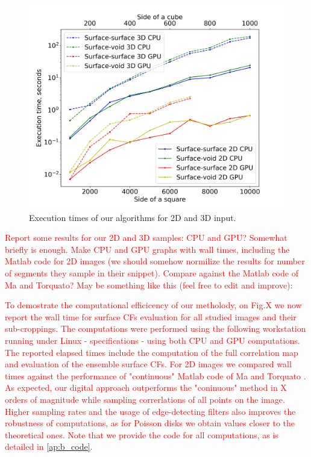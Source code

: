\documentclass[reprint,amsmath,amssymb,aps,pre,showkeys,showpacs]{revtex4-1}
\begin{document}
\begin{figure}[ht]
  \centering
  \includegraphics[width=\linewidth]{images/exec-time.png}
  \caption[]{Execution times of our algorithms for 2D and 3D input.}
  \label{fig:exec-times}
\end{figure}

\textcolor{red}{Report some results for our 2D and 3D samples: CPU and GPU?
  Somewhat briefly is enough. Make CPU and GPU graphs with wall times, including
  the Matlab code for 2D images (we should somehow normilize the results for
  number of segments they sample in their snippet). Compare against the Matlab
  code of Ma and Torquato? May be something like this (feel free to edit and
  improve):}

\textcolor{red}{To demostrate the computational efficicency of our metholody, on
  Fig.X we now report the wall time for surface CFs evaluation for all studied
  images and their sub-croppings. The computations were performed using the
  following workstation running under Linux - specifications - using both CPU
  and GPU computations. The reported elapsed times include the computation of
  the full correlation map and evaluation of the ensemble surface CFs. For 2D
  images we compared wall times against the performance of "continuous" Matlab
  code of Ma and Torquato \cite{ma2018SS}. As expected, our digital approach
  outperforms the "coninuous" method in X orders of magnitude while sampling
  correrlations of all points on the image. Higher sampling rates and the usage
  of edge-detecting filters also improves the robustness of computations, as for
  Poisson disks we obtain values closer to the theoretical ones. Note that we
  provide the code for all computations, as is detailed in \cref{ap:b_code}.}
\end{document}
